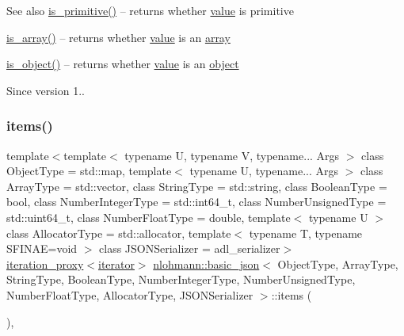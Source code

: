 \begin{DoxySeeAlso}{See also}
\mbox{\hyperlink{classnlohmann_1_1basic__json_a6362b88718eb5c6d4fed6a61eed44b95}{is\+\_\+primitive()}} -- returns whether \mbox{\hyperlink{classnlohmann_1_1basic__json_adcf8ca5079f5db993820bf50036bf45d}{value}} is primitive 

\mbox{\hyperlink{classnlohmann_1_1basic__json_aef9ce5dd2381caee1f8ddcdb5bdd9c65}{is\+\_\+array()}} -- returns whether \mbox{\hyperlink{classnlohmann_1_1basic__json_adcf8ca5079f5db993820bf50036bf45d}{value}} is an \mbox{\hyperlink{classnlohmann_1_1basic__json_a8a7d537fc297bbc5b845f92fe0445e3b}{array}} 

\mbox{\hyperlink{classnlohmann_1_1basic__json_af8f511af124e82e4579f444b4175787c}{is\+\_\+object()}} -- returns whether \mbox{\hyperlink{classnlohmann_1_1basic__json_adcf8ca5079f5db993820bf50036bf45d}{value}} is an \mbox{\hyperlink{classnlohmann_1_1basic__json_a31f84ee15c4690ff705bed74736d04c6}{object}}
\end{DoxySeeAlso}
\begin{DoxySince}{Since}
version 1.. 
\end{DoxySince}
\mbox{\label{classnlohmann_1_1basic__json_afe3e137ace692efa08590d8df40f58dd}} 
\subsubsection{\texorpdfstring{items()}{items()}\hspace{0.1cm}{\footnotesize\ttfamily [1/2]}}
{\footnotesize\ttfamily template$<$template$<$ typename U, typename V, typename... Args $>$ class Object\+Type = std\+::map, template$<$ typename U, typename... Args $>$ class Array\+Type = std\+::vector, class String\+Type  = std\+::string, class Boolean\+Type  = bool, class Number\+Integer\+Type  = std\+::int64\+\_\+t, class Number\+Unsigned\+Type  = std\+::uint64\+\_\+t, class Number\+Float\+Type  = double, template$<$ typename U $>$ class Allocator\+Type = std\+::allocator, template$<$ typename T, typename S\+F\+I\+N\+A\+E=void $>$ class J\+S\+O\+N\+Serializer = adl\+\_\+serializer$>$ \\
\mbox{\hyperlink{classnlohmann_1_1detail_1_1iteration__proxy}{iteration\+\_\+proxy}}$<$\mbox{\hyperlink{classnlohmann_1_1basic__json_a099316232c76c034030a38faa6e34dca}{iterator}}$>$ \mbox{\hyperlink{classnlohmann_1_1basic__json}{nlohmann\+::basic\+\_\+json}}$<$ Object\+Type, Array\+Type, String\+Type, Boolean\+Type, Number\+Integer\+Type, Number\+Unsigned\+Type, Number\+Float\+Type, Allocator\+Type, J\+S\+O\+N\+Serializer $>$\+::items (\begin{DoxyParamCaption}{ }\end{DoxyParamCaption})\hspace{0.3cm}{\ttfamily [inline]}, {\ttfamily [noexcept]}}




